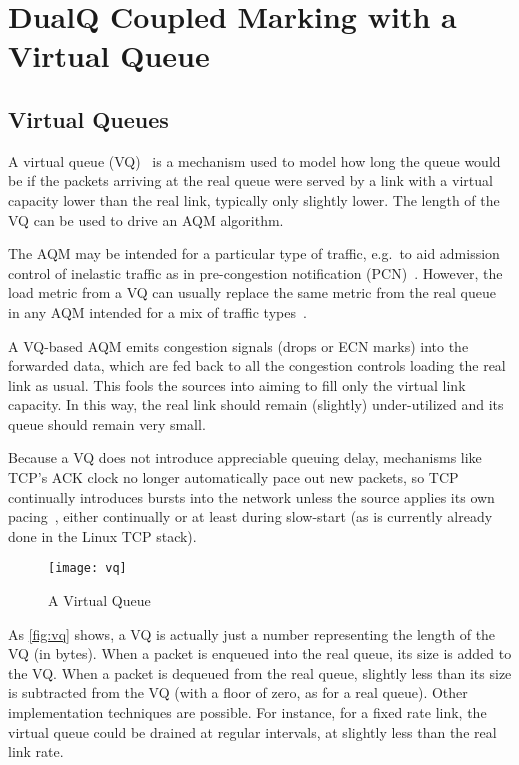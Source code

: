 

\section{DualQ Coupled Marking with a Virtual Queue}\label{l4saqmtr_vq}

\subsection{Virtual Queues}

A virtual queue (VQ)~\cite{Courcou96:Vq} is a mechanism used to model how long the queue would be if the packets arriving at the real queue were served by a link with a virtual capacity lower than the real link, typically only slightly lower. The length of the VQ can be used to drive an AQM algorithm. 

The AQM may be intended for a particular type of traffic, e.g.\ to aid admission control of inelastic traffic as in pre-congestion notification (PCN)~\cite{Eardley09:PCN-mark}. However, the load metric from a VQ can usually replace the same metric from the real queue in any AQM intended for a mix of traffic types~\cite{Kunniyur01:AVQ}. 

A VQ-based AQM emits congestion signals (drops or ECN marks) into the forwarded data, which are fed back to all the congestion controls loading the real link as usual. This fools the sources into aiming to fill only the virtual link capacity. In this way, the real link should remain (slightly) under-utilized and its queue should remain very small.

Because a VQ does not introduce appreciable queuing delay, mechanisms like TCP's ACK clock no longer automatically pace out new packets, so TCP continually introduces bursts into the network unless the source applies its own pacing~\cite{Alizadeh12:HULL}, either continually or at least during slow-start (as is currently already done in the Linux TCP stack). 

\begin{figure}[h]
	\centering
	\texttt{[image: vq]}
	\caption{A Virtual Queue}\label{fig:vq}
\end{figure}

As \autoref{fig:vq} shows, a VQ is actually just a number representing the length of the VQ (in bytes). When a packet is enqueued into the real queue, its size is added to the VQ. When a packet is dequeued from the real queue, slightly less than its size is subtracted from the VQ (with a floor of zero, as for a real queue). Other implementation techniques are possible. For instance, for a fixed rate link, the virtual queue could be drained at regular intervals, at slightly less than the real link rate.

